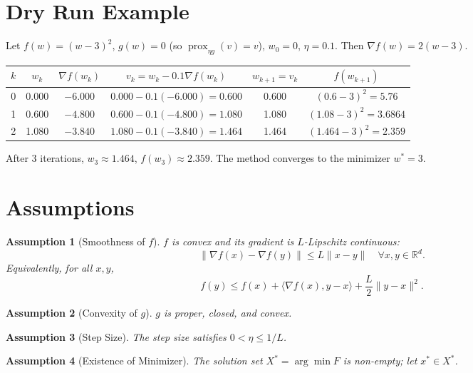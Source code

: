 \documentclass{article}
\newtheorem{assumption}{Assumption}
\begin{document}
\section*{Dry Run Example}
Let $f(w) = (w-3)^2$, $g(w) = 0$ (so $\operatorname{prox}_{\eta g}(v)=v$), $w_0 = 0$, $\eta = 0.1$.
Then $\nabla f(w) = 2(w-3)$.
\begin{center}
\begin{tabular}{c c c c c c}
\toprule
$k$ & $w_k$ & $\nabla f(w_k)$ & $v_k = w_k - 0.1 \nabla f(w_k)$ & $w_{k+1}=v_k$ & $f(w_{k+1})$ \\
\midrule
0 & 0.000 & $-6.000$ & $0.000 - 0.1(-6.000) = 0.600$ & 0.600 & $(0.6-3)^2 = 5.76$ \\
1 & 0.600 & $-4.800$ & $0.600 - 0.1(-4.800) = 1.080$ & 1.080 & $(1.08-3)^2 = 3.6864$ \\
2 & 1.080 & $-3.840$ & $1.080 - 0.1(-3.840) = 1.464$ & 1.464 & $(1.464-3)^2 = 2.359$ \\
\bottomrule
\end{tabular}
\end{center}
After 3 iterations, $w_3 \approx 1.464$, $f(w_3) \approx 2.359$. The method converges to the minimizer $w^*=3$.

\section*{Assumptions}
\begin{assumption}[Smoothness of $f$]\label{assump:smooth}
$f$ is convex and its gradient is $L$-Lipschitz continuous:
\[
\|\nabla f(x) - \nabla f(y)\| \le L \|x-y\| \quad \forall x,y \in \mathbb{R}^d.
\]
Equivalently, for all $x,y$,
\[
f(y) \le f(x) + \langle \nabla f(x), y-x \rangle + \frac{L}{2}\|y-x\|^2. \tag{Descent Lemma}
\]
\end{assumption}

\begin{assumption}[Convexity of $g$]\label{assump:convex_g}
$g$ is proper, closed, and convex.
\end{assumption}

\begin{assumption}[Step Size]\label{assump:step}
The step size satisfies $0 < \eta \le 1/L$.
\end{assumption}

\begin{assumption}[Existence of Minimizer]\label{assump:opt}
The solution set $X^* = \arg\min F$ is non‑empty; let $x^* \in X^*$.
\end{assumption}
\end{document}
